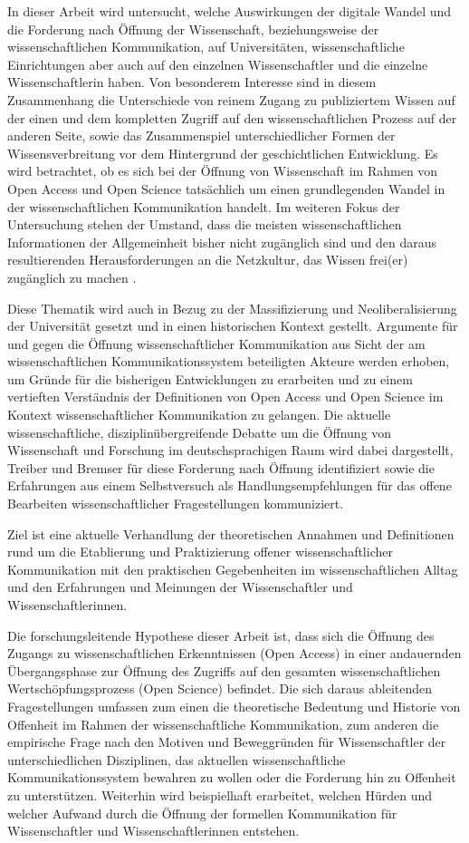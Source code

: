 In dieser Arbeit wird untersucht, welche Auswirkungen der digitale Wandel und die Forderung nach Öffnung der Wissenschaft, beziehungsweise der wissenschaftlichen Kommunikation, auf Universitäten, wissenschaftliche Einrichtungen aber auch auf den einzelnen Wissenschaftler und die einzelne Wissenschaftlerin haben. Von besonderem Interesse sind in diesem Zusammenhang die Unterschiede von reinem Zugang zu publiziertem Wissen auf der einen und dem kompletten Zugriff auf den wissenschaftlichen Prozess auf der anderen Seite, sowie das Zusammenspiel unterschiedlicher Formen der Wissensverbreitung vor dem Hintergrund der geschichtlichen Entwicklung. Es wird betrachtet, ob es sich bei der Öffnung von Wissenschaft im Rahmen von Open Access und Open Science tatsächlich um einen grundlegenden Wandel in der wissenschaftlichen Kommunikation handelt. Im weiteren Fokus der Untersuchung stehen der Umstand, dass die meisten wissenschaftlichen Informationen der Allgemeinheit bisher nicht zugänglich sind und den daraus resultierenden Herausforderungen an die Netzkultur, das Wissen frei(er) zugänglich zu machen \cite{cite:6}.

Diese Thematik wird auch in Bezug zu der Massifizierung und Neoliberalisierung der Universität gesetzt und in einen historischen Kontext gestellt. Argumente für und gegen die Öffnung wissenschaftlicher Kommunikation aus Sicht der am wissenschaftlichen Kommunikationssystem beteiligten Akteure werden erhoben, um Gründe für die bisherigen Entwicklungen zu erarbeiten und zu einem vertieften Verständnis der Definitionen von Open Access und Open Science im Kontext wissenschaftlicher Kommunikation zu gelangen. Die aktuelle wissenschaftliche, disziplinübergreifende Debatte um die Öffnung von Wissenschaft und Forschung im deutschsprachigen Raum wird dabei dargestellt, Treiber und Bremser für diese Forderung nach Öffnung identifiziert sowie die Erfahrungen aus einem Selbstversuch als Handlungsempfehlungen für das offene Bearbeiten wissenschaftlicher Fragestellungen kommuniziert.

Ziel ist eine aktuelle Verhandlung der theoretischen Annahmen und Definitionen rund um die Etablierung und Praktizierung offener wissenschaftlicher Kommunikation mit den praktischen Gegebenheiten im wissenschaftlichen Alltag und den Erfahrungen und Meinungen der Wissenschaftler und Wissenschaftlerinnen.

Die forschungsleitende Hypothese dieser Arbeit ist, dass sich die Öffnung des Zugangs zu wissenschaftlichen Erkenntnissen (Open Access) in einer andauernden Übergangsphase zur Öffnung des Zugriffs auf den gesamten wissenschaftlichen Wertschöpfungsprozess (Open Science) befindet. Die sich daraus ableitenden Fragestellungen umfassen zum einen die theoretische Bedeutung und Historie von Offenheit im Rahmen der wissenschaftliche Kommunikation, zum anderen die empirische Frage nach den Motiven und Beweggründen für Wissenschaftler der unterschiedlichen Disziplinen, das aktuellen wissenschaftliche Kommunikationssystem bewahren zu wollen oder die Forderung hin zu Offenheit zu unterstützen. Weiterhin wird beispielhaft erarbeitet, welchen Hürden und welcher Aufwand durch die Öffnung der formellen Kommunikation für Wissenschaftler und Wissenschaftlerinnen entstehen.


